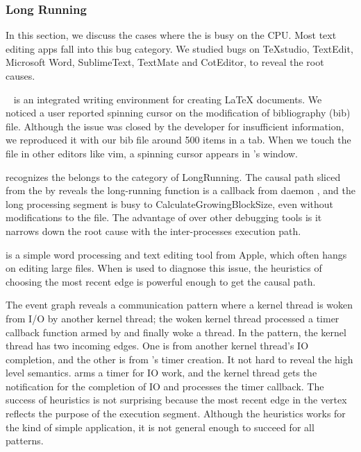 \subsubsection{Long Running}

In this section, we discuss the cases where the \spinningnode is busy on the
CPU. Most text editing apps fall into this bug category. We studied bugs on
TeXstudio, TextEdit, Microsoft Word, SublimeText, TextMate and CotEditor,
to reveal the root causes.


~\cite{TeXStudio} is an integrated writing environment for
creating LaTeX documents. We noticed a user reported spinning cursor on the
modification of bibliography (bib) file. Although the issue was closed by the
developer for insufficient information, we reproduced it with our bib file
around 500 items in a  tab. When we touch the file in
other editors like vim, a spinning cursor appears in 's window.

\xxx recognizes the \spinningnode belongs to the category of LongRunning. The
causal path sliced from the \spinningnode by \xxx reveals the long-running
function is a callback from daemon , and the long processing segment
is busy to CalculateGrowingBlockSize, even without modifications to the file.
The advantage of \xxx over other debugging tools is it narrows down the root
cause with the inter-processes execution path.


 is a simple word processing and text editing tool from Apple,
which often hangs on editing large files.  When \xxx is used to diagnose
this issue, the heuristics of choosing the most recent edge is powerful enough 
to get the causal path.

The event graph reveals a communication pattern where a kernel thread is woken
from I/O by another kernel thread; the woken kernel thread processed
a timer callback function armed by  and finally woke a 
thread. In the pattern, the kernel thread has two incoming edges. One is from
another kernel thread's IO completion, and the other is from 's timer
creation. It not hard to reveal the high level semantics.  arms a timer
for IO work, and the kernel thread gets the notification for the completion of IO
and processes the timer callback. The success of heuristics is not surprising
because the most recent edge in the vertex reflects the purpose of the execution
segment. Although the heuristics works for the kind of simple application, it is
not general enough to succeed for all patterns.


